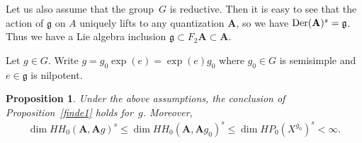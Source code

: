 \documentclass[pdftex]{sigma}
\numberwithin{equation}{section}
\newtheorem{Proposition}[Theorem]{Proposition}
\newcommand{\g}{\mathfrak{g}}
\begin{document}
Let us also assume that the group~$G$ is reductive. Then it is easy to see that the action of $\g$ on $A$ uniquely lifts to any quantization ${\mathbf A}$, so we have ${\rm Der}({\mathbf A})^s=\g$. Thus we have a Lie algebra inclusion $\g\subset F_2{\mathbf A}\subset {\mathbf A}$.

Let $g\in G$. Write $g=g_0\exp(e)=\exp(e)g_0$ where $g_0\in G$ is semisimple and $e\in \g$ is nilpotent.

\begin{Proposition}\label{finde2} Under the above assumptions, the conclusion of Proposition~{\rm \ref{finde1}} holds for~$g$. Moreover,
\begin{gather*}
\dim HH_0({\mathbf A},{\mathbf A}g)^s\le \dim HH_0({\mathbf A},{\mathbf A}g_0)^s\le \dim HP_0(X^{g_0})^s<\infty.
\end{gather*}
\end{Proposition}
\end{document}
